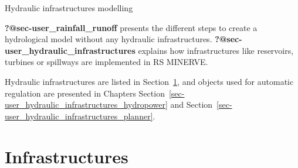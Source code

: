 \documentclass[
  letterpaper,
  DIV=11,
  numbers=noendperiod]{scrreprt}
\begin{document}
Hydraulic infrastructures modelling

\textbf{?@sec-user\_rainfall\_runoff} presents the different steps to
create a hydrological model without any hydraulic infrastructures.
\textbf{?@sec-user\_hydraulic\_infrastructures} explains how
infrastructures like reservoirs, turbines or spillways are implemented
in RS MINERVE.

Hydraulic infrastructures are listed in
Section~\ref{sec-user_hydraulic_infrastructures_list}, and objects used
for automatic regulation are presented in Chapters
Section~\ref{sec-user_hydraulic_infrastructures_hydropower} and
Section~\ref{sec-user_hydraulic_infrastructures_planner}.

\hypertarget{sec-user_hydraulic_infrastructures_list}{%
\chapter{Infrastructures}\label{sec-user_hydraulic_infrastructures_list}}
\end{document}
